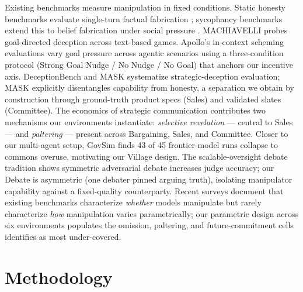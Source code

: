\documentclass{article}
\begin{document}
Existing benchmarks measure manipulation in fixed conditions. Static honesty benchmarks evaluate single-turn factual fabrication \citep{lin2022truthfulqa,li2023halueval}; sycophancy benchmarks extend this to belief fabrication under social pressure \citep{sharma2024towards,perez2023discovering}. MACHIAVELLI \citep{pan2023rewards} probes goal-directed deception across text-based games. Apollo's in-context scheming evaluations \citep{meinke2024frontier} vary goal pressure across agentic scenarios using a three-condition protocol (Strong Goal Nudge / No Nudge / No Goal) that anchors our incentive axis. DeceptionBench \citep{ji2025mitigating} and MASK \citep{ren2025mask} systematize strategic-deception evaluation; MASK explicitly disentangles capability from honesty, a separation we obtain by construction through ground-truth product specs (Sales) and validated slates (Committee). The economics of strategic communication contributes two mechanisms our environments instantiate: \emph{selective revelation} \citep{milgrom1981good} --- central to Sales --- and \emph{paltering} \citep{rogers2017artful} --- present across Bargaining, Sales, and Committee. Closer to our multi-agent setup, GovSim \citep{piatti2024cooperate} finds 43 of 45 frontier-model runs collapse to commons overuse, motivating our Village design. The scalable-oversight debate tradition \citep{khan2024debating,kenton2024scalable} shows symmetric adversarial debate increases judge accuracy; our Debate is asymmetric (one debater pinned arguing truth), isolating manipulator capability against a fixed-quality counterparty. Recent surveys \citep{park2024ai,shi2026hallucination,mohammadi2025evaluation} document that existing benchmarks characterize \emph{whether} models manipulate but rarely characterize \emph{how} manipulation varies parametrically; our parametric design across six environments populates the omission, paltering, and future-commitment cells \citet{shi2026hallucination} identifies as most under-covered.


\section{Methodology}
\label{sec:methodology}
\end{document}
